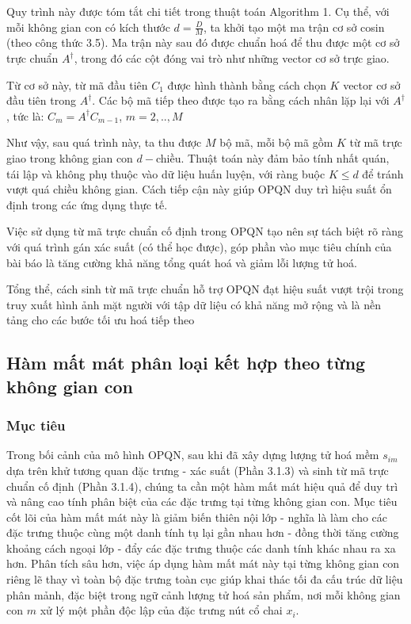 Quy trình này được tóm tắt chi tiết trong thuật toán Algorithm 1. Cụ thể, với mỗi không gian con có kích thước $d = \frac{D}{M}$, ta khởi tạo một ma trận cơ sở cosin (theo công thức 3.5). Ma trận này sau đó được chuẩn hoá để thu được một cơ sở trực chuẩn $A^\dagger$, trong đó các cột đóng vai trò như những vector cơ sở trực giao.

Từ cơ sở này, từ mã đầu tiên $C_1$ được hình thành bằng cách chọn $K$ vector cơ sở đầu tiên trong $A^\dagger$. Các bộ mã tiếp theo được tạo ra bằng cách nhân lặp lại với $A^\dagger$, tức là:
$C_m = A^\dagger C_{m-1}$, $m = 2,.., M$

Như vậy, sau quá trình này, ta thu được $M$ bộ mã, mỗi bộ mã gồm $K$ từ mã trực giao trong không gian con $d-$chiều. Thuật toán này đảm bảo tính nhất quán, tái lập và không phụ thuộc vào dữ liệu huấn luyện, với ràng buộc $ K \leq d $ để tránh vượt quá chiều không gian. Cách tiếp cận này giúp OPQN duy trì hiệu suất ổn định trong các ứng dụng thực tế.

Việc sử dụng từ mã trực chuẩn cố định trong OPQN tạo nên sự tách biệt rõ ràng với quá trình gán xác suất (có thể học được), góp phần vào mục tiêu chính của bài báo là tăng cường khả năng tổng quát hoá và giảm lỗi lượng tử hoá. 

Tổng thể, cách sinh từ mã trực chuẩn hỗ trợ OPQN đạt hiệu suất vượt trội trong truy xuất hình ảnh mặt người với tập dữ liệu có khả năng mở rộng và là nền tảng cho các bước tối ưu hoá tiếp theo

\subsection{Hàm mất mát phân loại kết hợp theo từng không gian con}
\subsubsection{Mục tiêu}
Trong bối cảnh của mô hình OPQN, sau khi đã xây dựng lượng tử hoá mềm $s_{im}$ dựa trên khử tương quan đặc trưng - xác suất (Phần 3.1.3) và sinh từ mã trực chuẩn cố định (Phần 3.1.4), chúng ta cần một hàm mất mát hiệu quả để duy trì và nâng cao tính phân biệt của các đặc trưng tại từng không gian con. Mục tiêu cốt lõi của hàm mất mát này là giảm biến thiên nội lớp - nghĩa là làm cho các đặc trưng thuộc cùng một danh tính tụ lại gần nhau hơn - đồng thời tăng cường khoảng cách ngoại lớp - đẩy các đặc trưng thuộc các danh tính khác nhau ra xa hơn. Phân tích sâu hơn, việc áp dụng hàm mất mát này tại từng không gian con riêng lẽ thay vì toàn bộ đặc trưng toàn cục giúp khai thác tối đa cấu trúc dữ liệu phân mảnh, đặc biệt trong ngữ cảnh lượng tử hoá sản phẩm, nơi mỗi không gian con $m$ xử lý một phần độc lập của đặc trưng nút cổ chai $x_i$.

